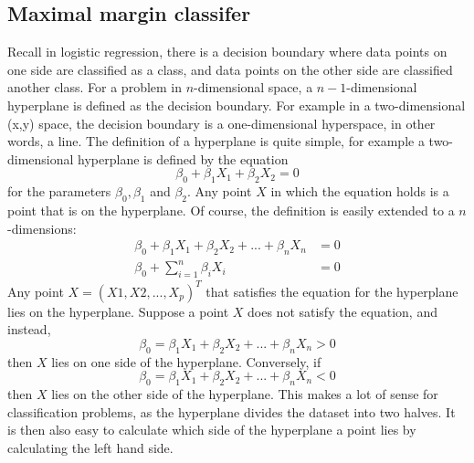 \documentclass[CS5104-Notes.tex]{subfiles}
\begin{document}
\subsection{Maximal margin classifer}
Recall in logistic regression, there is a decision boundary where data points on one side are classified as a class, and data points on the other side are classified another class. For a problem in $n$-dimensional space, a $n-1$-dimensional hyperplane is defined as the decision boundary. For example in a two-dimensional (x,y) space, the decision boundary is a one-dimensional hyperspace, in other words, a line.
\n
The definition of a hyperplane is quite simple, for example a two-dimensional hyperplane is defined by the equation
\begin{equation}
\beta_{0} + \beta_{1}X_{1} + \beta_{2}X_{2} = 0
\end{equation}
for the parameters $\beta_{0}, \beta_{1}$ and $\beta_{2}$. Any point $X$ in which the equation holds is a point that is on the hyperplane. Of course, the definition is easily extended to a $n$-dimensions:
\begin{align}
  \beta_{0} + \beta_{1}X_{1} + \beta_{2}X_{2} + ... + \beta_{n}X_{n} &= 0 \\
  \beta_{0} + \sum_{i=1}^{n}\beta_{i}X_{i} &= 0
\end{align}
Any point $X = (X1,X2,...,X_{p})^{T}$ that satisfies the equation for the hyperplane lies on the hyperplane. Suppose a point $X$ does not satisfy the equation, and instead,
\begin{equation}
\beta_{0} = \beta_{1}X_{1} + \beta_{2}X_{2} + ... + \beta_{n}X_{n} > 0
\end{equation}
then $X$ lies on one side of the hyperplane. Conversely, if
\begin{equation}
\beta_{0} = \beta_{1}X_{1} + \beta_{2}X_{2} + ... + \beta_{n}X_{n} < 0
\end{equation}
then $X$ lies on the other side of the hyperplane.
\n
This makes a lot of sense for classification problems, as the hyperplane divides the dataset into two halves. It is then also easy to calculate which side of the hyperplane a point lies by calculating the left hand side.
\end{document}
